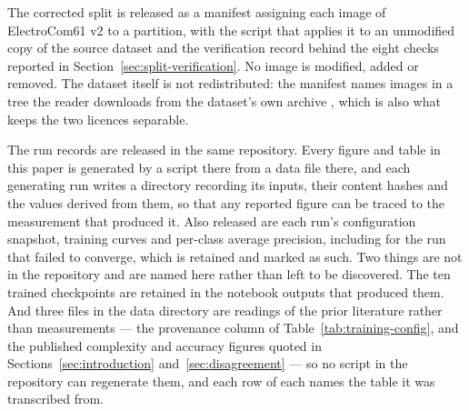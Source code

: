 The corrected split is released as a manifest assigning each image of
ElectroCom61 v2 to a partition, with the script that applies it to an
unmodified copy of the source dataset and the verification record behind the
eight checks reported in Section~\ref{sec:split-verification}. No image is
modified, added or removed. The dataset itself is not redistributed: the
manifest names images in a tree the reader downloads from the dataset's own
archive \citep{electrocom61}, which is also what keeps the two licences
separable.

The run records are released in the same repository. Every figure and table in
this paper is generated by a script there from a data file there, and each
generating run writes a directory recording its inputs, their content hashes and
the values derived from them, so that any reported figure can be traced to the
measurement that produced it. Also released are each run's configuration
snapshot, training curves and per-class average precision, including for the run
that failed to converge, which is retained and marked as such. Two things are
not in the repository and are named here rather than left to be discovered. The
ten trained checkpoints are retained in the notebook outputs that produced them.
And three files in the data directory are readings of the prior literature
rather than measurements --- the provenance
column of Table~\ref{tab:training-config}, and the published complexity and
accuracy figures quoted in Sections~\ref{sec:introduction}
and~\ref{sec:disagreement} --- so no script in the repository can regenerate
them, and each row of each names the table it was transcribed from.
